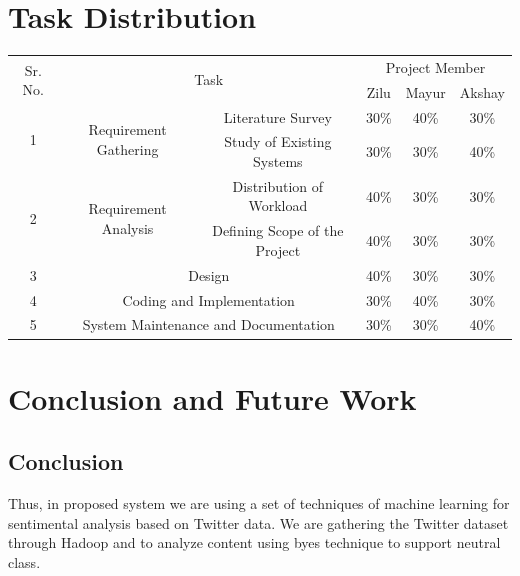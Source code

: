 \documentclass[a4paper,12pt]{report}
\begin{document}
\chapter{Task Distribution}
\begin{table}[h]
\centering
\caption{Task Distribution}
\label{tab:}
\begin{longtable}{|c|c|c|c|c|c|}
\cline{1-6}
\multirow{2}{*}{Sr. No.} & \multicolumn{2}{c|}{\multirow{2}{*}{Task}} & \multicolumn{3}{c|}{Project Member}\\
\cline{4-6}
& \multicolumn{2}{c|}{}& Zilu & Mayur & Akshay \\%
\cline{1-6}
\multirow{2}{*}{1} & \multirow{2}{*}{Requirement Gathering} & Literature Survey & 30\% & 40\% & 30\%\\
\cline{3-6}
 & & Study of Existing Systems & 30\% & 30\% & 40\%\\
\cline{1-6}
\multirow{2}{*}{2} & \multirow{2}{*}{Requirement Analysis} & Distribution of Workload & 40\% & 30\% & 30\%\\
\cline{3-6}
 & & Defining Scope of the Project & 40\% & 30\% & 30\%\\
\cline{1-6}
3 & \multicolumn{2}{c|}{Design} & 40\% & 30\% & 30\%\\
\cline{1-6}
4 & \multicolumn{2}{c|}{Coding and Implementation} & 30\% & 40\% & 30\%\\
\cline{1-6}
5 & \multicolumn{2}{c|}{System Maintenance and Documentation} & 30\% & 30\% & 40\%\\
\cline{1-6}

\end{longtable}
\end{table}
\chapter{Conclusion and Future Work}
	\section{Conclusion}
	Thus, in proposed system we are using a set of techniques of machine learning for sentimental analysis based on Twitter data. We are gathering the Twitter dataset through Hadoop and to analyze content using byes technique to support neutral class.
\end{document}

